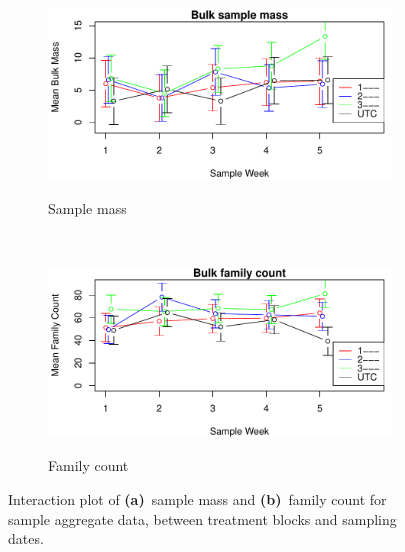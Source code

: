\documentclass[10pt,letterpaper,twocolumn]{article}
\begin{document}
\begin{figure}[h]
	\centering
	\begin{subfigure}[b]{0.45\textwidth}
		\caption{Sample mass}
		\includegraphics[width=\textwidth]{plots/bulk/2015_bulk_mass_interplot.pdf}
		\label{fig:bulk_mass_interplot}
	\end{subfigure}
	~
	\begin{subfigure}[b]{0.45\textwidth}
		\caption{Family count}
		\includegraphics[width=\textwidth]{plots/bulk/2015_bulk_family_interplot.pdf}
		\label{fig:bulk_family_interplot}
	\end{subfigure}
	\caption{Interaction plot of \textbf{(a)}~sample mass and \textbf{(b)}~family count for sample aggregate data, between treatment blocks and sampling dates.}
	\label{fig:bulk_interplot}
	\smallskip
	\nointerlineskip
	\hrulefill
\end{figure}
\end{document}
